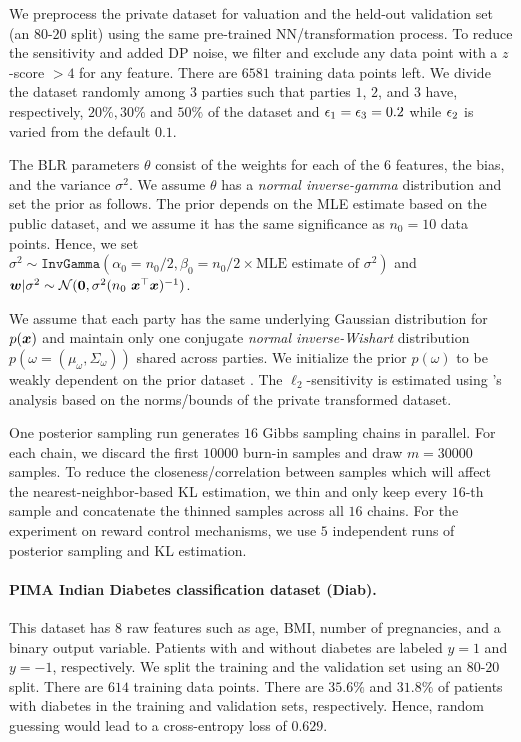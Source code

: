 \documentclass{article}
\theoremstyle{plain}
\theoremstyle{definition}
\theoremstyle{remark}
\renewcommand{\citet}[1]{\cite{#1}}
\begin{document}
We preprocess the private dataset for valuation and the held-out validation set (an $80$-$20$ split) using the same pre-trained NN/transformation process. To reduce the sensitivity and added DP noise, we filter and exclude any data point with a $z$-score $> 4$ for any feature. There are $6581$ training data points left. We divide the dataset randomly among $3$ parties such that parties $1$, $2$, and $3$ have, respectively, $20\%, 30\%$ and $50\%$ of the dataset  and ${\epsilon}_1 = {\epsilon}_3 = 0.2$ while ${\epsilon}_2$ is varied from the default $0.1$.

The BLR parameters $\theta$ consist of the weights for each of the $6$ features, the bias, and the variance $\sigma^2$. We assume $\theta$ has a \emph{normal inverse-gamma} distribution and set the prior as follows.
The prior depends on the MLE estimate based on the public dataset, and we assume it has the same significance as $n_0 = 10$ data points. Hence, we set
$\sigma^2 \sim \texttt{InvGamma}(\alpha_0= n_0/2, \beta_0 =n_0/2 \times \text{MLE estimate of } \sigma^2)$ and ${\bm{w}}|\sigma^2 \sim \mathcal{N}({\bm{0}}, \sigma^2 (n_0\ {\bm{x}}^\top {\bm{x}})^{-1})$. %

We assume that each party has the same underlying Gaussian distribution for $p({\bm{x}})$ and maintain only one conjugate \emph{normal inverse-Wishart} distribution $p(\omega = (\mu_{\omega},\Sigma_{\omega}))$ shared across parties. We initialize the prior $p(\omega)$ to be weakly dependent on the prior dataset \cite{murphy2022probabilistic}. %
The $\ell_2$-sensitivity is estimated using \citet{kulkarni2021locally}'s analysis based on the norms/bounds of the private transformed dataset.

One posterior sampling run generates $16$ Gibbs sampling chains in parallel. For each chain, we discard the first $10000$ burn-in samples and draw $m=30000$ samples. To reduce the closeness/correlation between samples which will affect the nearest-neighbor-based KL estimation, we thin and only keep every $16$-th sample and concatenate the thinned samples across all $16$ chains.
For the experiment on reward control mechanisms, we use $5$ independent runs of posterior sampling and KL estimation.


\paragraph{PIMA Indian Diabetes classification dataset (Diab).}
This dataset has $8$ raw features such as age, BMI, number of pregnancies, and a binary output variable. Patients with and without diabetes are labeled $y=1$ and $y=-1$, respectively. 
We split the training and the validation set using an $80$-$20$ split. There are $614$ training data points.
There are $35.6\%$ and $31.8\%$ of patients with diabetes in the training and validation sets, respectively. Hence, random guessing would lead to a cross-entropy loss of $0.629$.
\end{document}
